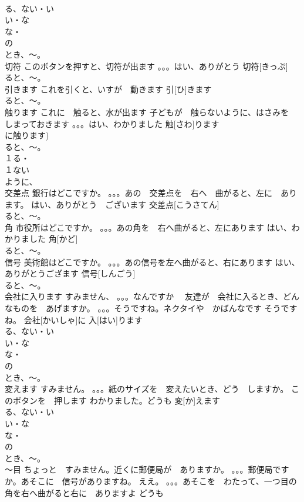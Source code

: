 \documentclass[8pt]{extreport}
\begin{document}
\begin{CJK}{UTF8}{min}
\\	る、ない・い
\\	い・な
\\	な・
\\	の
\\	とき、～。
\\	切符	このボタンを押すと、切符が出ます 。。。はい、ありがとう	切符[きっぷ]			
\\	ると、～。
\\	引きます	これを引くと、いすが　動きます	引[ひ]きます			
\\	ると、～。
\\	触ります	これに　触ると、水が出ます 子どもが　触らないように、はさみを　しまっておきます 。。。はい、わかりました	触[さわ]ります			
\\	に触ります)	
\\	ると、～。
\\	１る・
\\	１ない
\\	ように、
\\	交差点	銀行はどこですか。 。。。あの　交差点を　右へ　曲がると、左に　あります。 はい、ありがとう　ございます	交差点[こうさてん]			
\\	ると、～。
\\	角	市役所はどこですか。 。。。あの角を　右へ曲がると、左にあります はい、わかりました	角[かど]			
\\	ると、～。
\\	信号	美術館はどこですか。 。。。あの信号を左へ曲がると、右にあります はい、ありがとうござます	信号[しんごう]			
\\	ると、～。
\\	会社に入ります	すみません、 。。。なんですか　 友達が　会社に入るとき、どんなものを　あげますか。 。。。そうですね。ネクタイや　かばんなです そうですね。	会社[かいしゃ]に 入[はい]ります				
\\	る、ない・い
\\	い・な
\\	な・
\\	の
\\	とき、～。
\\	変えます	すみません。 。。。紙のサイズを　変えたいとき、どう　しますか。 このボタンを　押します わかりました。どうも	変[か]えます			
\\	る、ない・い
\\	い・な
\\	な・
\\	の
\\	とき、～。
\\	～目	ちょっと　すみません。近くに郵便局が　ありますか。 。。。郵便局ですか。あそこに　信号がありますね。 ええ。 。。。あそこを　わたって、一つ目の角を右へ曲がると右に　ありますよ どうも	

\end{CJK}
\end{document}
